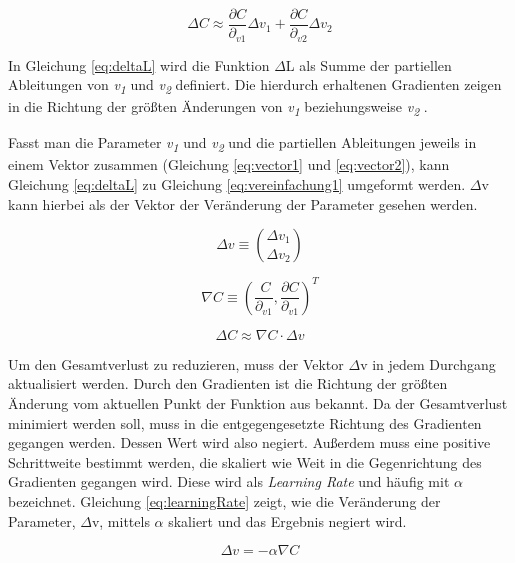 \begin{equation} \label{eq:deltaL}
    \Delta C \approx \frac{\partial C}{\partial_{v1}} \Delta v_{1} + \frac{\partial C}{\partial_{v2}} \Delta v_{2}
\end{equation}

In Gleichung \ref{eq:deltaL} wird die Funktion $\Delta$L als Summe der partiellen Ableitungen von \textit{v\textsubscript{1}} und \textit{v\textsubscript{2}} definiert. Die hierdurch erhaltenen Gradienten zeigen in die Richtung der größten Änderungen von \textit{v\textsubscript{1}} beziehungsweise \textit{v\textsubscript{2}} .

Fasst man die Parameter \textit{v\textsubscript{1}} und \textit{v\textsubscript{2}} und die partiellen Ableitungen jeweils in einem Vektor zusammen (Gleichung \ref{eq:vector1} und \ref{eq:vector2}), kann Gleichung \ref{eq:deltaL} zu Gleichung \ref{eq:vereinfachung1} umgeformt werden. $\Delta$v kann hierbei als der Vektor der Veränderung der Parameter gesehen werden.

\begin{equation} \label{eq:vector1} 
    \Delta v \equiv \binom{\Delta v_{1}}{ \Delta v_{2}}
\end{equation}

\begin{equation} \label{eq:vector2}
    \nabla C \equiv (\frac{\     C}{\partial_{v1}},  \frac{\partial C}{\partial_{v1}})^{T}
\end{equation}

\begin{equation} \label{eq:vereinfachung1}
    \Delta C \approx \nabla C \cdot \Delta v
\end{equation}

Um den Gesamtverlust zu reduzieren, muss der Vektor $\Delta$v in jedem Durchgang aktualisiert werden. Durch den Gradienten ist die Richtung der größten Änderung vom aktuellen Punkt der Funktion aus bekannt. Da der Gesamtverlust minimiert werden soll, muss in die entgegengesetzte Richtung des Gradienten gegangen werden. Dessen Wert wird also negiert. Außerdem muss eine positive Schrittweite bestimmt werden, die skaliert wie Weit in die Gegenrichtung des Gradienten gegangen wird. Diese wird als \textit{Learning Rate} und häufig mit $\alpha$ bezeichnet. Gleichung \ref{eq:learningRate} zeigt, wie die Veränderung der Parameter, $\Delta$v, mittels $\alpha$ skaliert und das Ergebnis negiert wird.

\begin{equation} \label{eq:learningRate}
    \Delta v = -\alpha \nabla C
\end{equation}      

